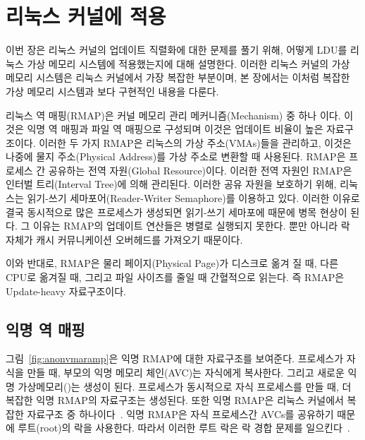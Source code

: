 \newpage
\section{리눅스 커널에 적용}
\label{sec:linux}

이번 장은 리눅스 커널의 업데이트 직렬화에 대한 문제를 풀기 위해,
어떻게 LDU를 리눅스 가상 메모리 시스템에 적용했는지에 대해 설명한다.
이러한 리눅스 커널의 가상 메모리 시스템은 리눅스 커널에서 가장 복잡한 부분이며, 
본 장에서는 이처럼 복잡한 가상 메모리 시스템과 보다 구현적인 내용을 다룬다.

리눅스 역 매핑(RMAP)은 커널 메모리 관리 메커니즘(Mechanism) 중 하나 이다.
이것은 익명 역 매핑과 파일 역 매핑으로 구성되며 이것은 업데이트 비율이 높은 자료구조이다.
이러한 두 가지 RMAP은 리눅스의 가상 주소(VMAs)들을 관리하고, 이것은 나중에 물지 주소(Physical Address)를 
가상 주소로 변환할 때 사용된다.
RMAP은 프로세스 간 공유하는 전역 자원(Global Resource)이다.
이러한 전역 자원인 RMAP은 인터벌 트리(Interval Tree)에 의해 관리된다.
이러한 공유 자원을 보호하기 위해, 리눅스는 읽기-쓰기 세마포어(Reader-Writer Semaphore)를 이용하고 있다.
이러한 이유로 결국 동시적으로 많은 프로세스가 생성되면 읽기-쓰기 세마포에 때문에 병목 현상이 된다.
그 이유는 RMAP의 업데이트 연산들은 병렬로 실행되지 못한다. 
뿐만 아니라 락 자체가 캐시 커뮤니케이션 오버헤드를 가져오기 때문이다.

이와 반대로, RMAP은 물리 페이지(Physical Page)가 디스크로 옮겨 질 때, 다른 CPU로 옮겨질 때, 그리고 
파일 사이즈를 줄일 때 간혈적으로 읽는다. 즉 RMAP은 Update-heavy 자료구조이다.

\subsection{익명 역 매핑}


그림~\ref{fig:anonvmaramp}은 익명 RMAP에 대한 자료구조를 보여준다.
프로세스가 자식을 만들 때, 부모의 익명 메모리 체인(AVC)는 자식에게 복사한다. 
그리고 새로운 익명 가상메모리()는 생성이 된다.
프로세스가 동시적으로 자식 프로세스를 만들 때, 더 복잡한 익명 RMAP의 자료구조는 생성된다.
또한 익명 RMAP은 리눅스 커널에서 복잡한 자료구조 중 하나이다~\cite{CorbetLWNANON}.
익명 RMAP은 자식 프로세스간 AVCs를 공유하기 때문에 루트(root)의 락을 사용한다.
따라서 이러한 루트 락은 락 경합 문제를 일으킨다~\cite{Andi2011adding}.  

